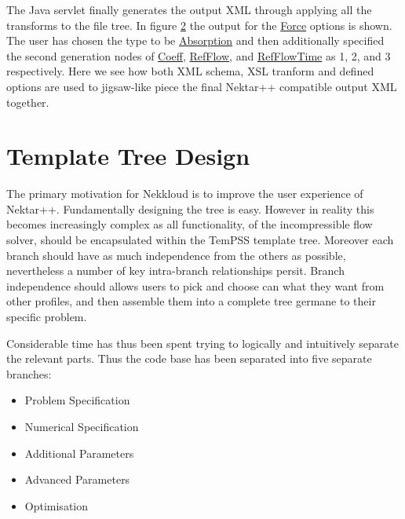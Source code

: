 \documentclass[11pt, a4paper]{report}
\begin{document}
\begin{figure}[htb!]
 \centering
 
 \label{fig:xsl_final}
\end{figure}

\begin{figure}[htb!]
 \centering
 
 \label{fig:xml_output}
\end{figure}

The Java servlet finally generates the output XML through applying all the transforms to the file tree. In figure \ref{fig:xml_output} the output for the \url{Force} options is shown. The user has chosen the type to be \url{Absorption} and then additionally specified the second generation nodes of \url{Coeff}, \url{RefFlow}, and \url{RefFlowTime} as 1, 2, and 3 respectively. Here we see how both XML schema, XSL tranform and defined options are used to jigsaw-like piece the final Nektar++ compatible output XML together.

\section{Template Tree Design}
The primary motivation for Nekkloud is to improve the user experience of Nektar++. Fundamentally designing the tree is easy. However in reality this becomes increasingly complex as all functionality, of the incompressible flow solver, should be encapsulated within the TemPSS template tree. Moreover each branch should have as much independence from the others as possible, nevertheless a number of key intra-branch relationships persit. Branch independence should allows users to pick and choose can what they want from other profiles, and then assemble them into a complete tree germane to their specific problem.

Considerable time has thus been spent trying to logically and intuitively separate the relevant parts. Thus the code base has been separated into five separate branches:

\begin{itemize}
\item Problem Specification
\item Numerical Specification
\item Additional Parameters
\item Advanced Parameters
\item Optimisation
\end{itemize}
\end{document}
